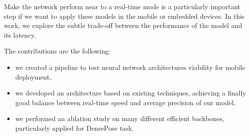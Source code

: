 Make the network perform near to a real-time mode is a particularly important step if we want to apply these models in the mobile or embedded devices. In this work, we explore the subtle trade-off between the performance of the model and its latency.

The contributions are the following:
\begin{itemize}
    \item we created a pipeline to test neural network architectures viability for mobile deployment,
    \item we developed an architecture based on existing techniques, achieving a finally good balance between real-time speed and average precision of our model,
    \item we performed an ablation study on many different efficient backbones, particularly applied for DensePose task.
\end{itemize}